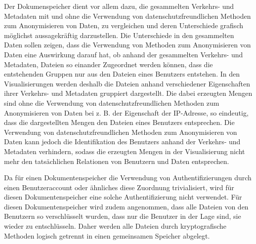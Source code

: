 \documentclass[
    fontsize=12pt,
    headings=small,
    parskip=half,           %
    bibliography=totoc,
    numbers=noenddot,       %
    open=any,               %
    ]{scrreprt}
\begin{document}
Der Dokumenspeicher dient vor allem dazu, die gesammelten Verkehrs- und Metadaten mit und ohne die Verwendung von datenschutzfreundlichen Methoden zum Anonymisieren von Daten, zu vergleichen und deren Unterschiede grafisch möglichst aussagekräftig darzustellen.
Die Unterschiede in den gesammelten Daten sollen zeigen, dass die Verwendung von Methoden zum Anonymisieren von Daten eine Auswirkung darauf hat, ob anhand der gesammelten Verkehrs- und Metadaten, Dateien so einander Zugeordnet werden können, dass die entstehenden Gruppen nur aus den Dateien eines Benutzers entstehen.
In den Visualisierungen werden deshalb die Dateien anhand verschiedener Eigenschaften ihrer Verkehrs- und Metadaten gruppiert dargestellt.
Die dabei erzeugten Mengen sind ohne die Verwendung von datenschutzfreundlichen Methoden zum Anonymisieren von Daten bei z. B. der Eigenschaft der IP-Adresse, so eindeutig, dass die dargestellten Mengen den Dateien eines Benutzers entsprechen.
Die Verwendung von datenschutzfreundlichen Methoden zum Anonymisieren von Daten kann jedoch die Identifikation des Benutzers anhand der Verkehrs- und Metadaten verhindern, sodass die erzeugten Mengen in der Visualisierung nicht mehr den tatsächlichen Relationen von Benutzern und Daten entsprechen.

Da für einen Dokumentenspeicher die Verwendung von Authentifizierungen durch einen Benutzeraccount oder ähnliches diese Zuordnung trivialisiert, wird für diesen Dokumentenspeicher eine solche Authentifizierung nicht verwendet.
Für diesen Dokumentenspeicher wird zudem angenommen, dass alle Dateien von den Benutzern so verschlüsselt wurden, dass nur die Benutzer in der Lage sind, sie wieder zu entschlüsseln.
Daher werden alle Dateien durch kryptografische Methoden logisch getrennt in einen gemeinsamen Speicher abgelegt.
\end{document}
